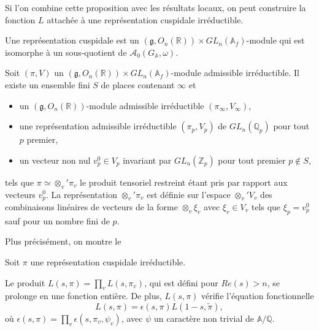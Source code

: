 Si l'on combine cette proposition avec les résultats locaux, on peut construire la fonction $L$ attachée à une représentation cuspidale irréductible.
\begin{definition}
Une représentation cuspidale est un $(\mathfrak{g}, O_n(\mathbb{R})) \times GL_n(\mathbb{A}_f)$-module qui est isomorphe à un sous-quotient de $\mathcal{A}_0(G_\mathbb{A}, \omega)$.
\end{definition}

\begin{proposition}
\label{prodtens}
Soit $(\pi, V)$ un $(\mathfrak{g}, O_n(\mathbb{R})) \times GL_n(\mathbb{A}_f)$-module admissible irréductible. Il existe un ensemble fini $S$ de places contenant $\infty$ et
\begin{itemize}
\item un $(\mathfrak{g}, O_n(\mathbb{R}))$-module admissible irréductible $(\pi_\infty, V_\infty)$,
\item une représentation admissible irréductible $(\pi_p, V_p)$ de $GL_n(\mathbb{Q}_p)$ pour tout $p$ premier,
\item un vecteur non nul $v_p^0 \in V_p$ invariant par $GL_n(\mathbb{Z}_p)$ pour tout premier $p \not \in S$,
\end{itemize}
tels que $\pi \simeq \otimes_v' \pi_v$ le produit tensoriel restreint étant pris par rapport aux vecteurs $v_p^0$. La représentation $\otimes_v' \pi_v$ est définie sur l'espace $\otimes_v' V_v$ des combinaisons linéaires de vecteurs de la forme $\otimes_v \xi_v$ avec $\xi_v \in V_v$ tels que $\xi_p = v_p^0$ sauf pour un nombre fini de $p$.
\end{proposition}

Plus précisément, on montre le
\begin{theoreme}
Soit $\pi$ une représentation cuspidale irréductible.

Le produit $L(s, \pi) = \prod_v L(s, \pi_v)$, qui est défini pour $Re(s) > n$, se prolonge en une fonction entière. De plus, $L(s, \pi)$ vérifie l'équation fonctionnelle
\begin{equation}
L(s,\pi) = \epsilon(s,\pi)L(1-s,\tilde{\pi}),
\end{equation}
où $\epsilon(s,\pi) = \prod_v \epsilon(s, \pi_v, \psi_v)$, avec $\psi$ un caractère non trivial de $\mathbb{A}/\mathbb{Q}$.
\end{theoreme}

